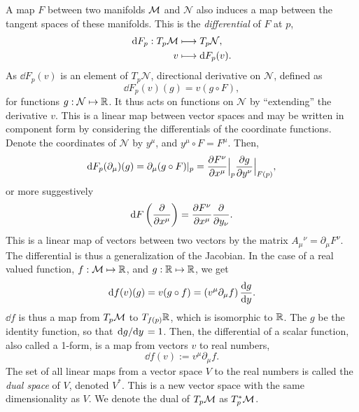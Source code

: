 A map $F$ between two manifolds $\mathcal{M}$ and $\mathcal N$ also induces a map between the tangent spaces of these manifolds.
This is the \emph{differential} of $F$ at $p$, 
%
\begin{align}
    \text{d} F_p: T_p \mathcal{M} & \longmapsto T_p \mathcal N, \\
    v & \longmapsto \text{d} F_p (v). 
\end{align}
%
As $\dd F_p(v)$ is an element of $T_p \mathcal N$,   directional derivative on $\mathcal N$, defined as
%
\begin{equation}
    \dd F_p(v) (g) = v(g \circ F),
\end{equation}
%
for functions $g : \mathcal N \mapsto \mathbb{R}$.
It thus acts on functions on $\mathcal N$ by ``extending'' the derivative $v$.
This is a linear map between vector spaces and may be written in component form by considering the differentials of the coordinate functions.
Denote the coordinates of $\mathcal N$ by $y^\mu$, and $y^\mu \circ F = F^\mu$.
Then,
%
\begin{equation}
    \text{d} F_p (\partial_\mu) (g) = \partial_\mu (g \circ F) |_p 
    = \pdv{F^\nu}{x^\mu}\Big |_p \pdv{g}{y^\nu} \Big  |_{F(p)},
\end{equation}
%
or more suggestively
%
\begin{equation}
    \text{d} F \left( \pdv{}{x^\mu} \right) = \pdv{F^\nu}{x^\mu} \pdv{}{y_\nu}.
\end{equation}
%
This is a linear map of vectors between two vectors by the matrix $A_\mu{}^\nu = \partial_\mu F^\nu$.
The differential is thus a generalization of the Jacobian.
In the case of a real valued function, $f: \mathcal{M} \mapsto \mathbb{R}$, and $g : \mathbb{R} \mapsto \mathbb{R}$, we get
%
\begin{equation}
    \dd f (v) (g) 
    = v(g \circ f) 
    = (v^\mu \partial_\mu f) \, \odv{g}{y}.
\end{equation}
%
$\dd f$ is thus a map from $T_p \mathcal{M}$ to $T_{f(p)}\mathbb{R}$, which is isomorphic to $\mathbb{R}$.
The $g$ be the identity function, so that $\odv{g}/{y} = 1$.
Then, the differential of a scalar function, also called a 1-form, is a map from vectors $v$ to real numbers,
%
\begin{equation}
    \label{covectors i.e. one forms}
    \dd f(v) := v^\mu \partial_\mu f.
\end{equation}
%
The set of all linear maps from a vector space $V$ to the real numbers is called the \emph{dual space} of $V$, denoted $V^*$.
This is a new vector space with the same dimensionality as $V$.
We denote the dual of $T_p \mathcal{M}$ as $T_p^* \mathcal{M}$.
